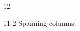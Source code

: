 \documentclass[paper=A4]{ropas-poster}
\begin{document}
\begin{postergrid}{1}{2}
\begin{posterblock}{1}{1-2}
Spanning columns.
\end{posterblock}
\end{postergrid}
\end{document}
